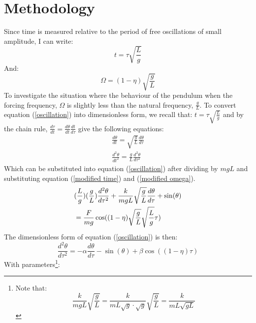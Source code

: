 \documentclass[10pt, twocolumn]{article}
\begin{document}
\section{Methodology}
Since time is measured relative to the period of free oscillations of small amplitude, I can write:
\begin{equation}
    t = \tau\sqrt{\frac{L}{g}}
    \label{modified time}
\end{equation}
And:
\begin{equation}
    \Omega = (1 - \eta)\sqrt{\frac{g}{L}}
    \label{modified omega}
\end{equation}
To investigate the situation where the behaviour of the pendulum when the forcing frequency, $\Omega$ is slightly less than the natural frequency, $\frac{g}{L}$.
To convert equation (\ref{oscillation}) into dimensionless form, we recall that: $t = \tau\sqrt{\frac{L}{g}}$  and by the chain rule, $\frac{d\tau}{dt} = \frac{d\theta}{dt}\frac{dt}{d\tau}$ give the following equations:
\begin{equation}
    \begin{split}
        \frac{d\theta}{dt} = \sqrt{\frac{g}{L}}\frac{d\theta}{d\tau} \\
        \frac{d^2\theta}{dt^2} = \frac{g}{L}\frac{d^2\theta}{d\tau^2}
    \end{split}
    \label{chain rules}
\end{equation}
Which can be substituted into equation (\ref{oscillation}) after dividing by $mgL$ and substituting equation (\ref{modified time}) and (\ref{modified omega}).
\begin{equation}
        \centering
        \begin{split}
            & (\frac{L}{g})(\frac{g}{L})\frac{d^2\theta}{d\tau^2} + \frac{k}{mgL}\sqrt{\frac{g}{L}}\frac{d\theta}{d\tau} + \sin(\theta)\\
            & = \frac{F}{mg}\cos((1 - \eta)\sqrt{\frac{g}{L}}\sqrt{\frac{L}{g}}\tau)
        \end{split}    
\end{equation}
The dimensionless form of equation (\ref{oscillation}) is then:
\begin{equation}
    \frac{d^2\theta}{d\tau^2} = -\alpha\frac{d\theta}{d\tau} - \sin(\theta) + \beta\cos((1 - \eta)\tau)
    \label{dimensionless}
\end{equation}
With parameters\footnote{
    Note that:
    \\
        \begin{equation}
            \frac{k}{mgL}\sqrt{\frac{g}{L}} = \frac{k}{mL\sqrt{g}\cdot\sqrt{g}}\sqrt{\frac{g}{L}} = \frac{k}{mL\sqrt{gL}}
        \end{equation}
}: 
\end{document}
